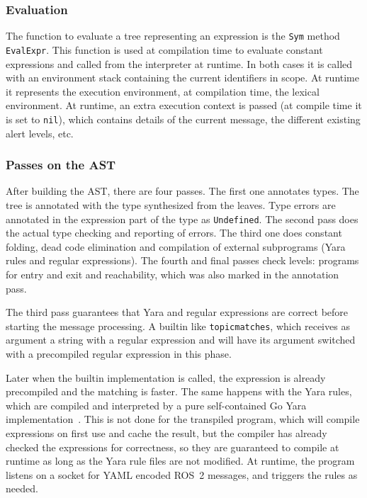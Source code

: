 \documentclass[a4paper]{article}
\begin{document}
\subsubsection{Evaluation}

The function to evaluate a tree representing an expression is the
\verb+Sym+ method \verb+EvalExpr+. This function is used at compilation
time to evaluate constant expressions and called from the interpreter at
runtime. In both cases it is called with an environment stack containing the
current identifiers in scope. At runtime it represents the execution
environment, at compilation time, the lexical environment.  At runtime, an
extra execution context is passed (at compile time it is set to \verb+nil+),
which contains details of the current message, the different existing alert levels, etc.

\subsubsection{Passes on the AST}
After building the AST, there are four passes.  The first one
annotates types. The tree is annotated with the type synthesized from the leaves.
Type errors are annotated in the expression part of the type as
\texttt{Undefined}.  The second pass does the actual type checking and
reporting of errors.
The third one does constant folding, dead code elimination and
compilation of external subprograms (Yara rules and regular expressions).
The fourth and final passes check levels: programs for entry and exit and reachability,
which was also marked in the annotation pass.

The third pass guarantees that Yara and regular expressions are correct before
starting the message processing. A builtin like \texttt{topicmatches},
which receives as argument a string with a regular expression and will have
its argument switched with a precompiled regular expression in this phase.

Later when the builtin implementation is called, the expression is
already precompiled and the matching is faster.
The same happens with the Yara rules, which are compiled and interpreted
by a pure self-contained Go Yara implementation~\cite{goyara}.  This is
not done for the transpiled program, which will compile expressions on
first use and cache the result, but the compiler has already checked
the expressions for correctness, so they are guaranteed to compile at
runtime as long as the Yara rule files are not modified.
At runtime, the program listens on a
socket for YAML encoded ROS~2 messages, and triggers the rules as needed.
\end{document}

